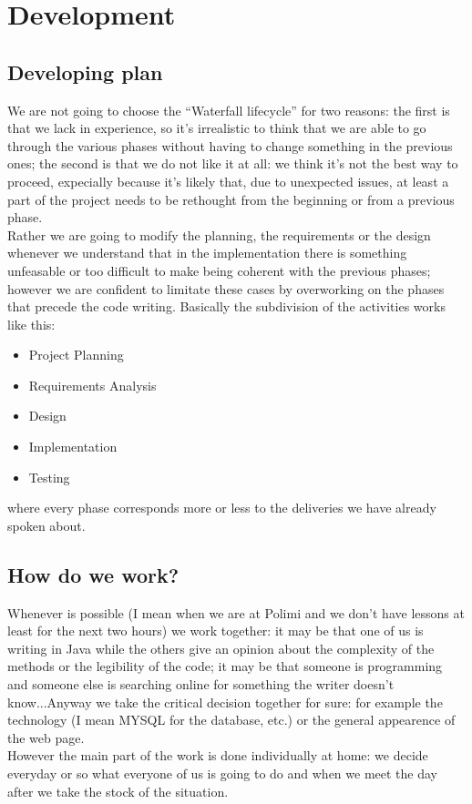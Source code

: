 \documentclass[a4paper,12pt]{article}
\begin{document}
\clearpage

\section{Development}
\subsection{Developing plan}
We are not going to choose the “Waterfall lifecycle” for two reasons: the first is that we lack in experience, so it’s irrealistic to think that we are able to go through the various phases without having to change something in the previous ones; the second is that we do not like it at all: we think it’s not the best way to proceed, expecially because it’s likely that, due to unexpected issues, at least a part of the project needs to be rethought from the beginning or from a previous phase.\\[1\baselineskip]Rather we are going to modify the planning, the requirements or the design whenever we understand that in the implementation there is something unfeasable or too difficult to make being coherent with the previous phases; however we are confident to limitate these cases by overworking on the phases that precede the code writing. Basically the subdivision of the activities works like this:
\begin{itemize}
\item Project Planning
\item Requirements Analysis
\item Design
\item Implementation
\item Testing
\end{itemize}
where every phase corresponds more or less to the deliveries
we have already spoken about.

\subsection{How do we work?}
Whenever is possible (I mean when we are at Polimi and we don’t have lessons at least for the next two hours) we work together: it may be that one of us is writing in Java while the others give an opinion about the complexity of the methods or the legibility of the code; it may be that someone is programming and someone else is searching online for something the writer doesn’t know...Anyway we take the critical decision together for sure: for example the technology (I mean MYSQL for the database, etc.) or the general appearence of the web page.\\[1\baselineskip]However the main part of the work is done individually at home: we decide everyday or so what everyone of us is going to do and when we meet the day after we take the stock of the situation.
\end{document}
